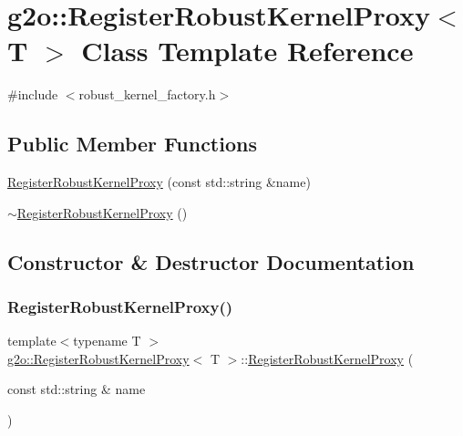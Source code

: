 \hypertarget{classg2o_1_1_register_robust_kernel_proxy}{}\section{g2o\+:\+:Register\+Robust\+Kernel\+Proxy$<$ T $>$ Class Template Reference}
\label{classg2o_1_1_register_robust_kernel_proxy}


{\ttfamily \#include $<$robust\+\_\+kernel\+\_\+factory.\+h$>$}

\subsection*{Public Member Functions}
\begin{DoxyCompactItemize}
\item 
\mbox{\hyperlink{classg2o_1_1_register_robust_kernel_proxy_a9eb5309c892d96d5cc5b3d7a15670818}{Register\+Robust\+Kernel\+Proxy}} (const std\+::string \&name)
\item 
\mbox{\hyperlink{classg2o_1_1_register_robust_kernel_proxy_a01e3078be667d1faaf2046da6c219eb7}{$\sim$\+Register\+Robust\+Kernel\+Proxy}} ()
\end{DoxyCompactItemize}


\subsection{Constructor \& Destructor Documentation}
\mbox{\label{classg2o_1_1_register_robust_kernel_proxy_a9eb5309c892d96d5cc5b3d7a15670818}} 
\subsubsection{\texorpdfstring{Register\+Robust\+Kernel\+Proxy()}{RegisterRobustKernelProxy()}}
{\footnotesize\ttfamily template$<$typename T $>$ \\
\mbox{\hyperlink{classg2o_1_1_register_robust_kernel_proxy}{g2o\+::\+Register\+Robust\+Kernel\+Proxy}}$<$ T $>$\+::\mbox{\hyperlink{classg2o_1_1_register_robust_kernel_proxy}{Register\+Robust\+Kernel\+Proxy}} (\begin{DoxyParamCaption}\item[{const std\+::string \&}]{name }\end{DoxyParamCaption})\hspace{0.3cm}{\ttfamily [inline]}}

